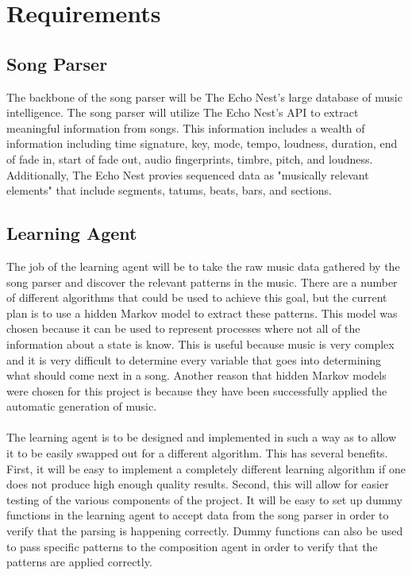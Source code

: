 \documentclass{article}
\begin{document}
\section{Requirements}
\subsection{Song Parser}
The backbone of the song parser will be The Echo Nest's large database of music intelligence.  The song parser will utilize The Echo Nest's API to extract meaningful information from songs.  This information includes a wealth of information including time signature, key, mode, tempo, loudness, duration, end of fade in, start of fade out, audio fingerprints, timbre, pitch, and loudness.  Additionally, The Echo Nest provies sequenced data as "musically relevant elements" that include segments, tatums, beats, bars, and sections.

\subsection{Learning Agent}
The job of the learning agent will be to take the raw music data gathered by the song parser and discover the relevant patterns in the music. There are a number of different algorithms that could be used to achieve this goal, but the current plan is to use a hidden Markov model to extract these patterns. This model was chosen because it can be used to represent processes where not all of the information about a state is know. This is useful because music is very complex and it is very difficult to determine every variable that goes into determining what should come next in a song. Another reason that hidden Markov models were chosen for this project is because they have been successfully applied the automatic generation of music.\\
\\
The learning agent is to be designed and implemented in such a way as to allow it to be easily swapped out for a different algorithm. This has several benefits. First, it will be easy to implement a completely different learning algorithm if one does not produce high enough quality results. Second, this will allow for easier testing of the various components of the project. It will be easy to set up dummy functions in the learning agent to accept data from the song parser in order to verify that the parsing is happening correctly. Dummy functions can also be used to pass specific patterns to the composition agent in order to verify that the patterns are applied correctly.
\end{document}

